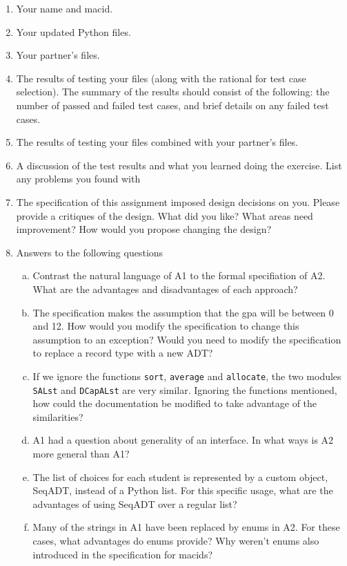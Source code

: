 \documentclass[12pt]{article}
\begin{document}
\begin{enumerate}
\item Your name and macid.
\item Your updated Python files.
\item Your partner's files.
\item The results of testing your files (along with the rational for test case
  selection).  The summary of the results should consist of the following: the
  number of passed and failed test cases, and brief details on any failed test
  cases.
\item The results of testing your files combined with your partner's files.
\item A discussion of the test results and what you learned doing the exercise.
  List any problems you found with
\item The specification of this assignment imposed design decisions on you.
  Please provide a critiques of the design.  What did you like?  What areas need
  improvement?  How would you propose changing the design?
\item Answers to the following questions
\begin{enumerate}[a)]
\item Contrast the natural language of A1 to the formal specifiation of A2.
  What are the advantages and disadvantages of each approach?
\item The specification makes the assumption that the gpa will be between 0 and
  12.  How would you modify the specification to change this assumption to an
  exception?  Would you need to modify the specification to replace a record
  type with a new ADT?
\item If we ignore the functions \texttt{sort}, \texttt{average} and
  \texttt{allocate}, the two modules \texttt{SALst} and \texttt{DCapALst} are
  very similar.  Ignoring the functions mentioned, how could the documentation
  be modified to take advantage of the similarities?
\item A1 had a question about generality of an interface.  In what ways is A2
  more general than A1?
\item The list of choices for each student is represented by a custom object,
  SeqADT, instead of a Python list.  For this specific usage, what are the
  advantages of using SeqADT over a regular list?
\item Many of the strings in A1 have been replaced by enums in A2.  For these
  cases, what advantages do enums provide?  Why weren't enums also introduced in
  the specification for macids?  
\end{enumerate}
\end{enumerate}
\end{document}

